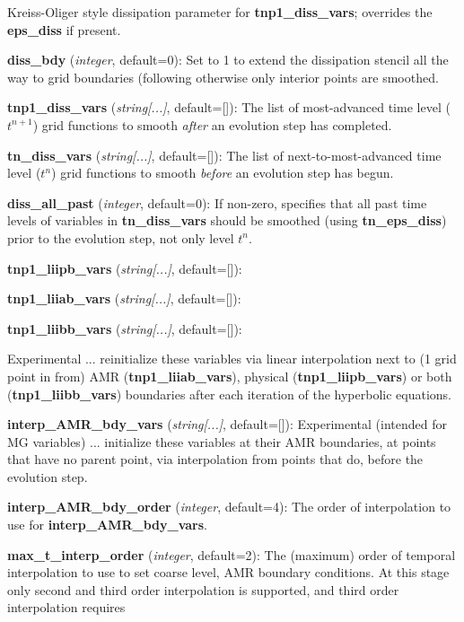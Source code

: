 \documentclass[aps,amssymb,unsortedaddress,nofootinbib]{revtex4}
\def\lsep{\itemsep 0.05in}
\begin{document}
\begin{list}{}{\lsep}
      Kreiss-Oliger style dissipation parameter for {\bf tnp1\_diss\_vars}; overrides
      the {\bf eps\_diss} if present.
\item {\bf diss\_bdy} ({\em integer}, default=0):
      Set to 1 to extend the dissipation stencil all the way to grid boundaries
      (following \cite{calabrese_et_al} otherwise only interior points are smoothed.
\item {\bf tnp1\_diss\_vars} ({\em string[...]}, default=[]):
      The list of most-advanced time level ($t^{n+1}$) grid functions to smooth 
      {\em after} an evolution step has completed.
\item {\bf tn\_diss\_vars} ({\em string[...]}, default=[]):
      The list of next-to-most-advanced time level ($t^{n}$) grid functions to smooth 
      {\em before} an evolution step has begun.
\item {\bf diss\_all\_past} ({\em integer}, default=0):
      If non-zero, specifies that all past time levels of variables in 
      {\bf tn\_diss\_vars} should be smoothed (using {\bf tn\_eps\_diss})
      prior to the evolution step, not only level $t^n$.
\item {\bf tnp1\_liipb\_vars} ({\em string[...]}, default=[]):
\item {\bf tnp1\_liiab\_vars} ({\em string[...]}, default=[]):
\item {\bf tnp1\_liibb\_vars} ({\em string[...]}, default=[]): \par
      Experimental ... reinitialize these variables via linear interpolation next to (1 grid point in from) 
      AMR ({\bf tnp1\_liiab\_vars}), physical ({\bf tnp1\_liipb\_vars}) or both
      ({\bf tnp1\_liibb\_vars}) boundaries after each iteration of the hyperbolic equations.
\item {\bf interp\_AMR\_bdy\_vars} ({\em string[...]}, default=[]):
      Experimental (intended for MG variables) ... initialize these variables at their AMR boundaries,
      at points that have no parent point, via interpolation from points that do,
      before the evolution step.
\item {\bf interp\_AMR\_bdy\_order} ({\em integer}, default=4):
      The order of interpolation to use for {\bf interp\_AMR\_bdy\_vars}.
\item {\bf max\_t\_interp\_order} ({\em integer}, default=2): The (maximum) order of temporal
      interpolation to use to set coarse level, AMR boundary conditions. At this stage only
      second and third order interpolation is supported, and third order interpolation requires

\end{list}
\end{document}
